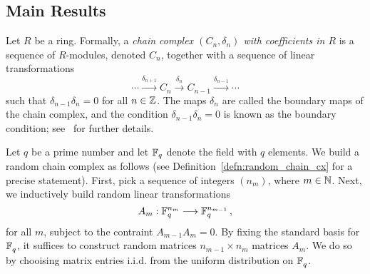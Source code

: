 \subsection*{Main Results}

Let $R$ be a ring.  Formally, a {\em chain complex $(C_n, \delta_n)$ with coefficients
in $R$} is a
sequence of $R$-modules, denoted $C_n$, together with a sequence of linear
transformations 
\[
  \cdots \xrightarrow{\delta_{n+1}} C_n \xrightarrow{\delta_n}
  C_{n-1} \xrightarrow{\delta_{n-1}} \cdots
\]
such that $\delta_{n-1}\delta_n = 0$ for all $n \in \mathbb{Z}$. The maps $\delta_n$ are called the boundary maps of the chain
complex, and the condition $\delta_{n-1} \delta_n = 0$ is known as the boundary
condition; see~\cite{hatcher2002algebraic} for further details.

%

Let $q$ be a prime number and let $\mathbb{F}_q$ denote the field with $q$ elements.
We build a random chain complex as follows (see Definition~\ref{defn:random_chain_cx}
for a precise statement). First, pick a 
sequence of integers $(n_m)$, where $m \in \mathbb{N}$. Next, we inductively
build random linear transformations 
\[
  A_m : \mathbb{F}_q^{n_m} \longrightarrow \mathbb{F}_q^{n_{m-1}} \, ,
\]
for all $m$, subject to the contraint $A_{m-1} A_m = 0$. By fixing the
standard basis for $\mathbb{F}_q^{}$, it suffices to construct random
matrices $n_{m-1} \times n_m$ matrices $A_m$. We do so by 
chooising matrix entries i.i.d. from the uniform distribution on
$\mathbb{F}_q^{}$. 


